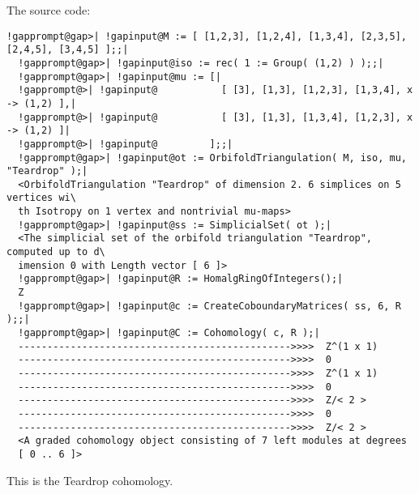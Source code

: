\documentclass[a4paper,11pt]{report}
\begin{document}
{{The source code: 
\begin{Verbatim}[commandchars=!@|,fontsize=\small,frame=single,label=Example]
  !gapprompt@gap>| !gapinput@M := [ [1,2,3], [1,2,4], [1,3,4], [2,3,5], [2,4,5], [3,4,5] ];;|
  !gapprompt@gap>| !gapinput@iso := rec( 1 := Group( (1,2) ) );;|
  !gapprompt@gap>| !gapinput@mu := [|
  !gapprompt@>| !gapinput@           [ [3], [1,3], [1,2,3], [1,3,4], x -> (1,2) ],|
  !gapprompt@>| !gapinput@           [ [3], [1,3], [1,3,4], [1,2,3], x -> (1,2) ]|
  !gapprompt@>| !gapinput@         ];;|
  !gapprompt@gap>| !gapinput@ot := OrbifoldTriangulation( M, iso, mu, "Teardrop" );|
  <OrbifoldTriangulation "Teardrop" of dimension 2. 6 simplices on 5 vertices wi\
  th Isotropy on 1 vertex and nontrivial mu-maps>
  !gapprompt@gap>| !gapinput@ss := SimplicialSet( ot );|
  <The simplicial set of the orbifold triangulation "Teardrop", computed up to d\
  imension 0 with Length vector [ 6 ]>
  !gapprompt@gap>| !gapinput@R := HomalgRingOfIntegers();|
  Z
  !gapprompt@gap>| !gapinput@c := CreateCoboundaryMatrices( ss, 6, R );;|
  !gapprompt@gap>| !gapinput@C := Cohomology( c, R );|
  ----------------------------------------------->>>>  Z^(1 x 1)
  ----------------------------------------------->>>>  0
  ----------------------------------------------->>>>  Z^(1 x 1)
  ----------------------------------------------->>>>  0
  ----------------------------------------------->>>>  Z/< 2 >
  ----------------------------------------------->>>>  0
  ----------------------------------------------->>>>  Z/< 2 >
  <A graded cohomology object consisting of 7 left modules at degrees
  [ 0 .. 6 ]>
\end{Verbatim}
 This is the Teardrop cohomology. }

 }

   
\end{document}
